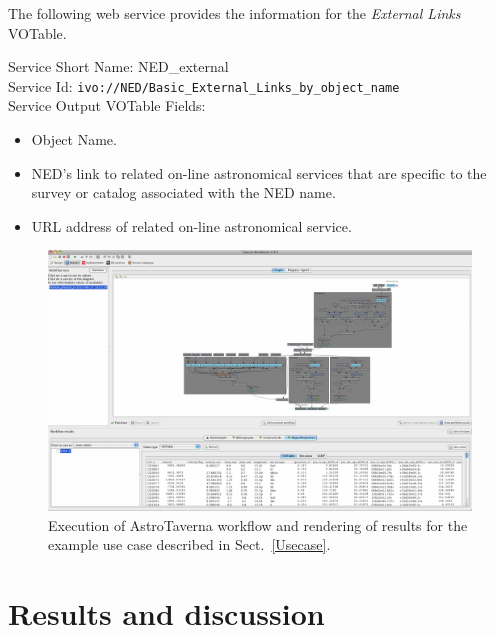 \documentclass{aa}
\begin{document}
\begin{samepage}
The following web service provides the information for the \textit{External Links} VOTable.

\begin{minipage}[h]{0.9\columnwidth}
  \small \vspace{\baselineskip}
\noindent Service Short Name: NED\_external\\
Service Id: \texttt{ivo://NED/Basic\_External\_Links\_by\_object\_name}\\
Service Output VOTable Fields:
\begin{itemize}
\item Object Name.
\item NED's link to related on-line astronomical services that are specific to the survey or catalog associated with the NED name.
\item URL address of related on-line astronomical service.
\end{itemize}
\vspace{\baselineskip}
\end{minipage}
\end{samepage}

\begin{figure}
\centering 
\includegraphics[width=0.99\columnwidth]{WfExec}
\caption{
Execution of AstroTaverna workflow and rendering of results for the example use case described in Sect.~\ref{Usecase}.
}
\label{fig:WfExec}
\end{figure}


\section{Results and discussion}
\label{ResultsAndDiscussion}
\end{document}
